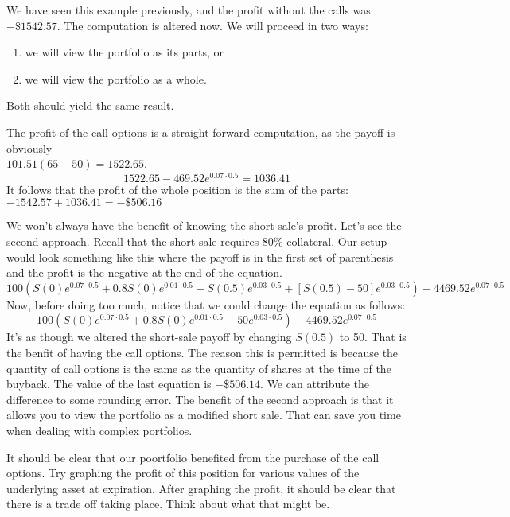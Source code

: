 \documentclass{ximera}
\begin{document}
\begin{solution}
We have seen this example previously, and the profit without the calls was $-\$1542.57$. The computation is altered now. We will proceed in two ways:
	\begin{enumerate}
	\item we will view the portfolio as its parts, or
	\item we will view the portfolio as a whole.	
	\end{enumerate}
Both should yield the same result.

The profit of the call options is a straight-forward computation, as the payoff is obviously\\
$101.51(65-50)=1522.65$.
	\begin{equation*}
	1522.65-469.52e^{0.07\cdot 0.5}=1036.41
	\end{equation*}
It follows that the profit of the whole position is the sum of the parts:\\
 $-1542.57+1036.41=-\$506.16$

We won't always have the benefit of knowing the short sale's profit. Let's see the second approach. Recall that the short sale requires 80\% collateral. Our setup would look something like this where the payoff is in the first set of parenthesis and the profit is the negative at the end of the equation.
	\begin{equation*}
	100\left(S(0)e^{0.07\cdot 0.5}+0.8S(0)e^{0.01\cdot 0.5}-S(0.5)e^{0.03\cdot 0.5}+[S(0.5)-50]e^{0.03\cdot 0.5}\right)-4469.52e^{0.07\cdot 0.5}
	\end{equation*}
Now, before doing too much, notice that we could change the equation as follows:
	\begin{equation*}
	100\left(S(0)e^{0.07\cdot 0.5}+0.8S(0)e^{0.01\cdot 0.5}-50e^{0.03\cdot 0.5}\right)-4469.52e^{0.07\cdot 0.5}
	\end{equation*}
It's as though we altered the short-sale payoff by changing $S(0.5)$ to 50. That is the benfit of having the call options. The reason this is permitted is because the quantity of call options is the same as the quantity of shares at the time of the buyback. The value of the last equation is $-\$506.14$. We can attribute the difference to some rounding error. The benefit of the second approach is that it allows you to view the portfolio as a modified short sale. That can save you time when dealing with complex portfolios.

It should be clear that our poortfolio benefited from the purchase of the call options. Try graphing the profit of this position for various values of the underlying asset at expiration. After graphing the profit, it should be clear that there is a trade off taking place. Think about what that might be.
\end{solution}
\end{document}
